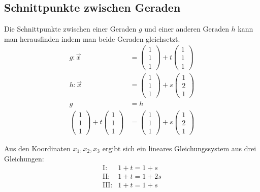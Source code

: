 \subsection{Schnittpunkte zwischen Geraden}
\begin{flushleft}
Die Schnittpunkte zwischen einer Geraden $g$ und einer anderen Geraden $h$ kann man herausfinden indem man beide Geraden gleichsetzt.
\begin{align}
    g\colon\vec{x}&=\begin{pmatrix} 1 \\ 1 \\ 1 \end{pmatrix}+t\begin{pmatrix} 1 \\ 1 \\ 1 \end{pmatrix} \\
    h\colon\vec{x}&=\begin{pmatrix} 1 \\ 1 \\ 1 \end{pmatrix}+s\begin{pmatrix} 1 \\ 2 \\ 1 \end{pmatrix} \\
    g&=h \\
    \begin{pmatrix} 1 \\ 1 \\ 1 \end{pmatrix}+t\begin{pmatrix} 1 \\ 1 \\ 1 \end{pmatrix}&=\begin{pmatrix} 1 \\ 1 \\ 1 \end{pmatrix}+s\begin{pmatrix} 1 \\ 2 \\ 1 \end{pmatrix}
\end{align}

Aus den Koordinaten $x_1,x_2,x_3$ ergibt sich ein lineares Gleichungssystem aus drei Gleichungen:
\begin{align}
    \text{I}\colon& 1+t=1+s \\
    \text{II}\colon& 1+t=1+2s \\
    \text{III}\colon& 1+t=1+s
\end{align}


\end{flushleft}
